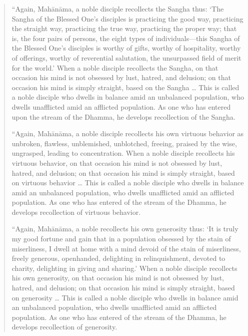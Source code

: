 \begin{quotation}
“Again, Mahānāma, a noble disciple recollects the Sangha thus: ‘The
Sangha of the Blessed One’s disciples is practicing the good way,
practicing the straight way, practicing the true way, practicing the
proper way; that is, the four pairs of persons, the eight types of
individuals—this Sangha of the Blessed One’s disciples is worthy of
gifts, worthy of hospitality, worthy of offerings, worthy of reverential
salutation, the unsurpassed field of merit for the world.’ When a noble
disciple recollects the Sangha, on that occasion his mind is not
obsessed by lust, hatred, and delusion; on that occasion his mind is
simply straight, based on the Sangha \ldots{} This is called a noble disciple
who dwells in balance amid an unbalanced population, who dwells
unafflicted amid an afflicted population. As one who has entered upon
the stream of the Dhamma, he develops recollection of the Sangha.

“Again, Mahānāma, a noble disciple recollects his own virtuous behavior
as unbroken, flawless, unblemished, unblotched, freeing, praised by the
wise, ungrasped, leading to concentration. When a noble disciple
recollects his virtuous behavior, on that occasion his mind is not
obsessed by lust, hatred, and delusion; on that occasion his mind is
simply straight, based on virtuous behavior \ldots{} This is called a noble
disciple who dwells in balance amid an unbalanced population, who dwells
unafflicted amid an afflicted population. As one who has entered of the
stream of the Dhamma, he develops recollection of virtuous behavior.

“Again, Mahānāma, a noble recollects his own generosity thus: ‘It is
truly my good fortune and gain that in a population obsessed by the
stain of miserliness, I dwell at home with a mind devoid of the stain of
miserliness, freely generous, openhanded, delighting in relinquishment,
devoted to charity, delighting in giving and sharing.’ When a noble
disciple recollects his own generosity, on that occasion his mind is not
obsessed by lust, hatred, and delusion; on that occasion his mind is
simply straight, based on generosity \ldots{} This is called a noble disciple
who dwells in balance amid an unbalanced population, who dwells
unafflicted amid an afflicted population. As one who has entered of the
stream of the Dhamma, he develops recollection of generosity.


\end{quotation}
